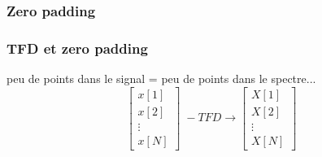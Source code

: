 \documentclass{beamer}
\begin{document}
\subsubsection{Zero padding}
\begin{frame}
\frametitle{TFD et zero padding}
peu de points dans le signal = peu de points dans le spectre...\\

\vspace{0.2cm}
\[
\begin{bmatrix} x[1] \\ x[2] \\ \vdots \\ x[N] \end{bmatrix} \; -TFD \rightarrow  
\begin{bmatrix} X[1] \\ X[2] \\ \vdots \\ X[N] \end{bmatrix}
\]


\end{frame} 
\end{document}
